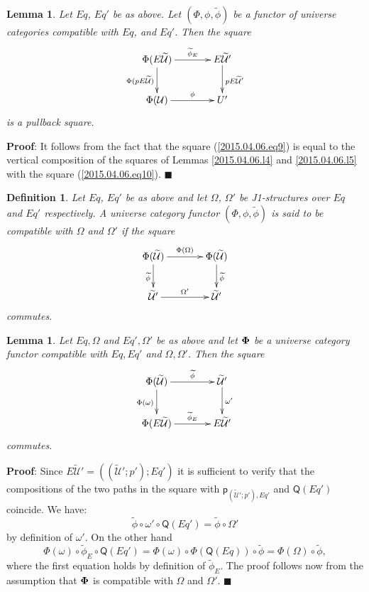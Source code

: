 \documentclass[12pt]{article}
\numberwithin{equation}{section}
\newenvironment{eq}{\begin{equation}}{\end{equation}}
\newenvironment{myproof}{{\bf Proof}:}{$\blacksquare$ \vskip 5mm }
\newtheorem{lemma}[proposition]{Lemma}
\newtheorem{definition}[proposition]{Definition}
\newcommand{\llabel}[1]{\label{#1}}
\newcommand{\wt}{\widetilde}
\newcommand{\p}{\mathsf{p}}
\newcommand{\U}{\mathcal{U}}
\newcommand{\Q}{\mathsf{Q}}
\begin{document}
%
\begin{lemma}
\llabel{2015.04.06.l6} Let $Eq$, $Eq'$ be as above. Let $(\Phi,\phi,\wt{\phi})$
be a functor of universe categories compatible with $Eq$, and $Eq'$. Then the
square
%
\begin{eq}\llabel{2015.04.06.eq9}
\begin{xy}
          \xymatrix@C=3pc{ \Phi(E\wt{\U}) \ar[r]^-{\wt{\phi}_{E}}
            \ar[d]_{\Phi(pE\wt{\U})} & E\wt{\U}' \ar[d]^{pE\wt{\U}'}\\ \Phi(\U)
            \ar[r]^-{\phi} & U' }
\end{xy}
\end{eq}%
%
is a pullback square.
%
\end{lemma} 
%
\begin{myproof}
It follows from the fact that the square (\ref{2015.04.06.eq9}) is equal to the
vertical composition of the squares of Lemmas \ref{2015.04.06.l4} and
\ref{2015.04.06.l5} with the square (\ref{2015.04.06.eq10}).
\end{myproof}
%


\begin{definition}
\llabel{2015.04.06.def5} Let $Eq$, $Eq'$ be as above and let $\Omega$,
$\Omega'$ be J1-structures over $Eq$ and $Eq'$ respectively. A universe
category functor $(\Phi,\phi,\wt{\phi})$ is said to be compatible with $\Omega$
and $\Omega'$ if the square
%
$$
\begin{xy}
          \xymatrix@C=3pc{ \Phi(\wt{\U}) \ar[r]^-{\Phi(\Omega)}
            \ar[d]_{\wt{\phi}} & \Phi(\wt{\U})\ar[d]^{\wt{\phi}}\\ \wt{\U}'
            \ar[r]^-{\Omega'} & \wt{\U}' }
\end{xy}
$$
%
commutes.
\end{definition}
%
\begin{lemma}
\llabel{2015.04.10.l7} Let $Eq,\Omega$ and $Eq',\Omega'$ be as above and let
${\bf\Phi}$ be a universe category functor compatible with $Eq,Eq'$ and
$\Omega,\Omega'$. Then the square
%
$$
\begin{xy}
          \xymatrix@C=3pc{ \Phi(\wt{\U}) \ar[r]^-{\wt{\phi}}
            \ar[d]_{\Phi(\omega)} & \wt{\U}'\ar[d]^-{\omega'}\\ \Phi(E\wt{\U})
            \ar[r]^-{\wt{\phi}_{E}} & E\wt{\U}' }
\end{xy}
$$
%
commutes.
\end{lemma}
%
\begin{myproof}
Since $E\wt{\U}'=((\wt{\U}';p');Eq')$ it is sufficient to verify that the
compositions of the two paths in the square with $\p_{(\wt{\U}';p'),Eq'}$ and
$\Q(Eq')$ coincide. We have:
%
$$\wt{\phi}\circ\omega'\circ \Q(Eq')=\wt{\phi}\circ\Omega'$$
%
by definition of $\omega'$. On the other hand
%
$$\Phi(\omega)\circ \wt{\phi}_{E}\circ \Q(Eq')=\Phi(\omega)\circ
\Phi(\Q(Eq))\circ \wt{\phi}=\Phi(\Omega)\circ\wt{\phi},$$
%
where the first equation holds by definition of $\wt{\phi}_{E}$. The proof
follows now from the assumption that ${\bf\Phi}$ is compatible with $\Omega$
and $\Omega'$.
\end{myproof}
%
\end{document}
